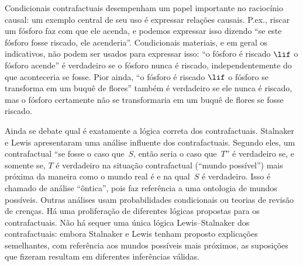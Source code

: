 \documentclass[../../../include/open-logic-section]{subfiles}
\begin{document}
Condicionais contrafactuais desempenham um papel importante no
raciocínio causal: um exemplo central de seu uso é expressar
relações causais. P.ex., riscar um fósforo faz com que ele acenda, e
podemos expressar isso dizendo ``se este fósforo fosse riscado, ele
acenderia''. Condicionais materiais, e em geral os indicativos, não podem ser
usados para expressar isso: ``o fósforo é riscado $\lif$ o fósforo acende''
é verdadeiro se o fósforo nunca é riscado, independentemente do que aconteceria
se fosse. Pior ainda, ``o fósforo é riscado $\lif$ o fósforo se transforma
em um buquê de flores'' também é verdadeiro se ele nunca é riscado, mas
o fósforo certamente não se transformaria em um buquê de flores se
fosse riscado.

Ainda se debate qual é exatamente a lógica correta dos contrafactuais.
Stalnaker e Lewis apresentaram uma análise influente dos contrafactuais.
Segundo eles, um contrafactual ``se fosse o caso que~$S$, então seria o caso
que~$T$'' é verdadeiro se, e somente se, $T$ é verdadeiro na situação
contrafactual (``mundo possível'') mais próxima da maneira como o mundo real
é e na qual~$S$ é verdadeiro. Isso é chamado de análise
``ôntica'', pois faz referência a uma ontologia de
mundos possíveis. Outras análises usam probabilidades condicionais
ou teorias de revisão de crenças. Há uma proliferação de diferentes
lógicas propostas para os contrafactuais. Não há sequer uma única
lógica Lewis--Stalnaker dos contrafactuais: embora Stalnaker e
Lewis tenham proposto explicações semelhantes, com referência aos mundos possíveis
mais próximos, as suposições que fizeram resultam em diferentes inferências
válidas.
\end{document}
